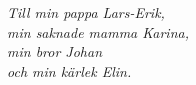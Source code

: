 \thispagestyle{empty}

\vspace*{4cm}
\begin{center}
	\textit{Till min pappa Lars-Erik,} \\
	\textit{min saknade mamma Karina,} \\
 	\textit{min bror Johan} \\
 	\textit{och min k\"arlek Elin.}
\end{center}
\vspace*{\fill}